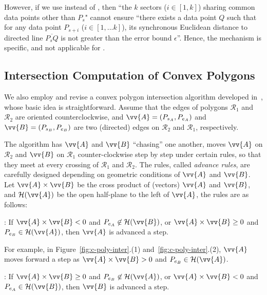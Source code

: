 However, if we use \sed instead of \ped, then  ``the $k$ sectors  ($i\in[1,k]$) sharing common data points other than $P_s$" cannot ensure ``there exists a data point $Q$ such that for any data point $P_{s+i}$ ($i \in [1, ... k]$), its synchronous Euclidean distance to directed line $\overline{P_sQ}$ is not greater than the error bound $\epsilon$''.
Hence, the \cia mechanism is \ped specific, and not applicable for \sed.







\subsection{Intersection Computation of Convex Polygons}
\label{subsec-cpi}

We also employ and revise a convex polygon intersection algorithm developed in~\cite{ORourke:Intersection}, whose basic idea is straightforward.
Assume \kwlog that the edges of polygons $\mathcal{R}_1$ and $\mathcal{R}_2$ are oriented counterclockwise, and $\vv{A} = (P_{s_A}, P_{e_A})$ and $\vv{B} = (P_{s_B}, P_{e_B})$ are two (directed) edges on $\mathcal{R}_2$ and $\mathcal{R}_1$, respectively.


The algorithm has $\vv{A}$ and $\vv{B}$ ``chasing'' one another, \ie moves $\vv{A}$ on $\mathcal{R}_2$ and $\vv{B}$ on $\mathcal{R}_1$ counter-clockwise step by step under certain rules, so that they meet at every crossing of $\mathcal{R}_1$ and $\mathcal{R}_2$.
%
The rules, called \emph{advance rules}, are carefully designed depending on geometric conditions of $\vv{A}$ and $\vv{B}$.
Let $\vv{A} \times \vv{B}$ be the cross product of (vectors) $\vv{A}$ and $\vv{B}$, and $\mathcal{H}(\vv{A})$ be the open half-plane to the left of $\vv{A}$, the rules are as follows:

: If $\vv{A} \times \vv{B} < 0$ and $P_{e_A} \not \in \mathcal{H}(\vv{B})$, or $\vv{A} \times \vv{B} \ge 0$ and $P_{e_B} \in \mathcal{H}(\vv{A})$, then $\vv{A}$ is advanced a step.

For example, in Figure~\ref{fig:c-poly-inter}.(1) and~\ref{fig:c-poly-inter}.(2), $\vv{A}$ moves forward a step as  $\vv{A} \times \vv{B} > 0$ and $P_{e_B} \in \mathcal{H}(\vv{A})$.

: If $\vv{A} \times \vv{B} \ge 0$ and $P_{e_B} \not \in \mathcal{H}(\vv{A})$, or $\vv{A} \times \vv{B} < 0$ and $P_{e_A} \in \mathcal{H}(\vv{B})$, then  $\vv{B}$ is advanced a step.


